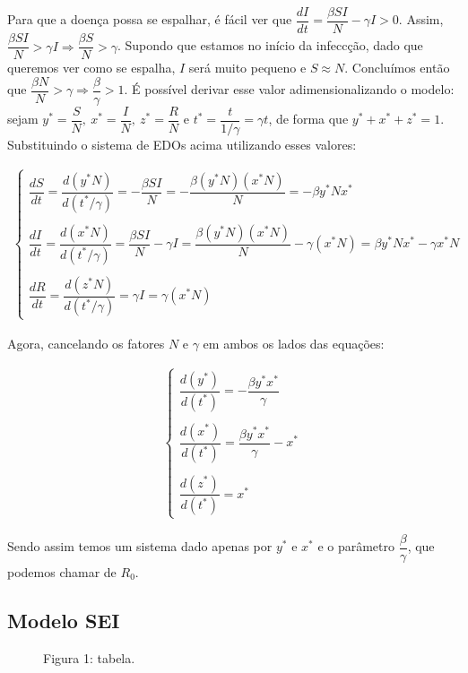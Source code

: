 \documentclass[12pt]{article}
\begin{document}
Para que a doença possa se espalhar, é fácil ver que $\dfrac{dI}{dt} = \dfrac{\beta SI}{N} - \gamma I > 0$. Assim, $\dfrac{\beta SI}{N} > \gamma I \Rightarrow \dfrac{\beta S}{N} > \gamma$. Supondo que estamos no início da infeccção, dado que queremos ver como se espalha, $I$ será muito pequeno e $S \approx N$. Concluímos então que $\dfrac{\beta N}{N} > \gamma \Rightarrow \dfrac{\beta}{\gamma} > 1$. É possível derivar esse valor adimensionalizando o modelo: sejam $y^* = \dfrac{S}{N}, \ x^* = \dfrac{I}{N}, \ z^* = \dfrac{R}{N}$ e $t^*=\dfrac{t}{1/\gamma} = \gamma t$, de forma que $y^*+x^*+z^*=1$. Substituindo o sistema de EDOs acima utilizando esses valores:

\begin{gather*}
\begin{cases}
\dfrac{dS}{dt} = \dfrac{d(y^*N)}{d(t^*/\gamma)} = -\dfrac{\beta SI}{N} = -\dfrac{\beta(y^*N)(x^*N)}{N} = -\beta y^*Nx^* \\
\\
\dfrac{dI}{dt} = \dfrac{d(x^*N)}{d(t^*/\gamma)} = \dfrac{\beta SI}{N} - \gamma I = \dfrac{\beta(y^*N)(x^*N)}{N} -\gamma(x^*N) = \beta y^*Nx^* - \gamma x^*N \\
\\
\dfrac{dR}{dt} = \dfrac{d(z^*N)}{d(t^*/\gamma)} = \gamma I = \gamma(x^*N)
\end{cases}
\end{gather*}

Agora, cancelando os fatores $N$ e $\gamma$ em ambos os lados das equações:

\begin{gather*}
\begin{cases}
\dfrac{d(y^*)}{d(t^*)} = -\dfrac{\beta y^*x^*}{\gamma} \\
\\
\dfrac{d(x^*)}{d(t^*)} = \dfrac{\beta y^*x^*}{\gamma} - x^* \\
\\
\dfrac{d(z^*)}{d(t^*)} = x^*
\end{cases}
\end{gather*}

Sendo assim temos um sistema dado apenas por $y^*$ e $x^*$ e o parâmetro $\dfrac{\beta}{\gamma}$, que podemos chamar de $R_0$.
 
\subsection{Modelo SEI}

\newpage
\begin{figure}[H]
\centering
\begin{center}
Figura 1: tabela.
\end{center}
\end{figure}
\end{document}
